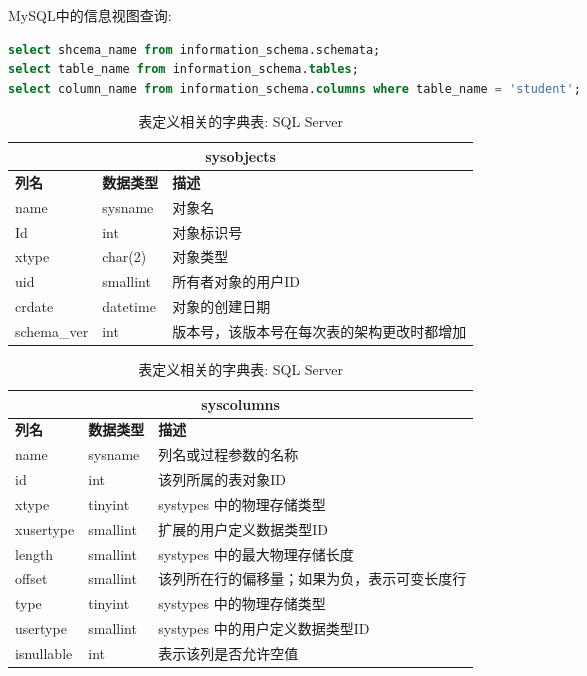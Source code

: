 MySQL中的信息视图查询:
\begin{lstlisting}[language=SQL]
select shcema_name from information_schema.schemata;
select table_name from information_schema.tables;
select column_name from information_schema.columns where table_name = 'student';
\end{lstlisting}

\begin{table}[H]
\centering
\label{tab:sysobjects}
\begin{tabular}{|l|l|l|}
\hline
\multicolumn{3}{|c|}{sysobjects} \\ \hline
\textbf{列名} & \textbf{数据类型} & \textbf{描述} \\ \hline
name & sysname & 对象名 \\ \hline
Id & int & 对象标识号 \\ \hline
xtype & char(2) & 对象类型 \\ \hline
uid & smallint & 所有者对象的用户ID \\ \hline
crdate & datetime & 对象的创建日期 \\ \hline
schema\_ver & int & 版本号，该版本号在每次表的架构更改时都增加 \\ \hline
\end{tabular}
\caption{表定义相关的字典表: SQL Server}
\end{table}

\begin{table}[H]
\centering
\label{tab:syscolumns}
\begin{tabular}{|l|l|l|}
\hline
\multicolumn{3}{|c|}{syscolumns} \\ \hline
\textbf{列名} & \textbf{数据类型} & \textbf{描述} \\ \hline
name & sysname & 列名或过程参数的名称 \\ \hline
id & int & 该列所属的表对象ID \\ \hline
 xtype & tinyint & systypes 中的物理存储类型 \\ \hline
xusertype & smallint & 扩展的用户定义数据类型ID \\ \hline
length & smallint & systypes 中的最大物理存储长度 \\ \hline
offset & smallint & 该列所在行的偏移量；如果为负，表示可变长度行 \\ \hline
type & tinyint & systypes 中的物理存储类型 \\ \hline
usertype & smallint & systypes 中的用户定义数据类型ID \\ \hline
isnullable & int & 表示该列是否允许空值 \\ \hline
\end{tabular}
\caption{表定义相关的字典表: SQL Server}
\end{table}

